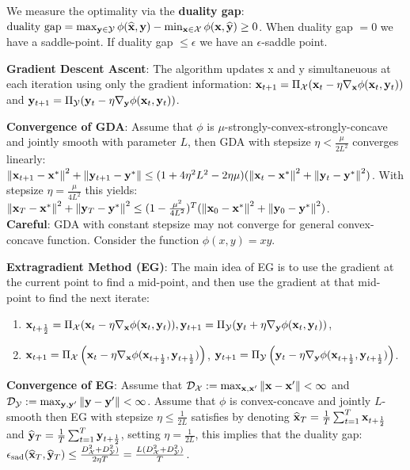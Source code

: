 We measure the optimality via the \textbf{duality gap}: $\text{duality gap} = \max_{\mathbf{y} \in \mathcal{Y}} \phi(\widehat{\mathbf{x}}, \mathbf{y}) - \min_{\mathbf{x} \in \mathcal{X}} \phi(\mathbf{x}, \widehat{\mathbf{y}}) \geq 0$. When duality gap $=0$ we have a saddle-point. If duality gap $\leq \epsilon$ we have an $\epsilon$-saddle point. \\
\begin{framed}
    \textbf{Gradient Descent Ascent}: The algorithm updates x and y simultaneuous at each iteration using
only the gradient information: $\mathbf{x}_{t+1} = \Pi_{\mathcal{X}}(\mathbf{x}_t - \eta \nabla_{\mathbf{x}} \phi(\mathbf{x}_t, \mathbf{y}_t))$ and $\mathbf{y}_{t+1} = \Pi_{\mathcal{Y}}(\mathbf{y}_t - \eta \nabla_{\mathbf{y}} \phi(\mathbf{x}_t, \mathbf{y}_t))$.
\end{framed}
\textbf{Convergence of GDA}: Assume that $\phi$ is $\mu$-strongly-convex-strongly-concave and jointly smooth with parameter $L$, then GDA with stepsize $\eta < \frac{\mu}{2L^2}$ converges linearly: $ \norm{\mathbf{x}_{t+1} - \mathbf{x}^*}^2 + \norm{\mathbf{y}_{t+1} - \mathbf{y}^*} \leq (1 + 4\eta^2 L^2 - 2\eta \mu)(\norm{\mathbf{x}_t - \mathbf{x}^*}^2 + \norm{\mathbf{y}_t - \mathbf{y}^*}^2)$. With stepsize $\eta = \frac{\mu}{4L^2}$ this yields: $\norm{\mathbf{x}_T - \mathbf{x}^*}^2 + \norm{\mathbf{y}_T - \mathbf{y}^*}^2 \leq (1 - \frac{\mu^2}{4L^2})^T (\norm{\mathbf{x}_0 - \mathbf{x}^*}^2 + \norm{\mathbf{y}_0 - \mathbf{y}^*}^2)$. \\
\textbf{Careful}: GDA with constant stepsize may not converge for general convex-concave function. Consider the function $\phi(x, y) = xy$. \\
\begin{framed}
    \textbf{Extragradient Method (EG)}: The main idea of EG is to use the gradient at the current point to find a mid-point, and then use the gradient at that mid-point to find the next iterate:
    \begin{enumerate}[label=, topsep=0pt,itemsep=0ex,partopsep=0ex,parsep=0ex, leftmargin=0cm] 
        \itemsep0em
        \item $\mathbf{x}_{t+\frac{1}{2}} = \Pi_{\mathcal{X}}(\mathbf{x}_t - \eta \nabla_{\mathbf{x}} \phi(\mathbf{x}_t, \mathbf{y}_t)), \mathbf{y}_{t+1} = \Pi_{\mathcal{Y}}(\mathbf{y}_t + \eta \nabla_{\mathbf{y}} \phi(\mathbf{x}_t, \mathbf{y}_t))$,
        \item $\mathbf{x}_{t+1} = \Pi_{\mathcal{X}}\left(\mathbf{x}_t - \eta \nabla_{\mathbf{x}} \phi(\mathbf{x}_{t+\frac{1}{2}}, \mathbf{y}_{t + \frac{1}{2}})\right)$, $\mathbf{y}_{t+1} = \Pi_{\mathcal{Y}}\left(\mathbf{y}_t - \eta \nabla_{\mathbf{y}} \phi(\mathbf{x}_{t+\frac{1}{2}}, \mathbf{y}_{t + \frac{1}{2}})\right)$.
    \end{enumerate}
\end{framed}
\textbf{Convergence of EG}: Assume that $\mathcal{D}_{\mathcal{X}} := \max_{\mathbf{x}, \mathbf{x}'}{\norm{\mathbf{x} - \mathbf{x}'}} < \infty$ and $\mathcal{D}_{\mathcal{Y}} := \max_{\mathbf{y}, \mathbf{y}'}{\norm{\mathbf{y} - \mathbf{y}'}} < \infty$. Assume that $\phi$ is convex-concave and jointly $L$-smooth then EG with stepsize $\eta \leq \frac{1}{2L}$ satisfies by denoting $\widehat{\mathbf{x}}_T = \frac{1}{T}\sum_{t=1}^T{\mathbf{x}_{t+\frac{1}{2}}}$ and $\widehat{\mathbf{y}}_T = \frac{1}{T}\sum_{t=1}^T{\mathbf{y}_{t+\frac{1}{2}}}$, setting $\eta = \frac{1}{2L}$, this implies that the duality gap: $\epsilon_{\text{sad}}(\widehat{\mathbf{x}}_T, \widehat{\mathbf{y}}_T) \leq \frac{D_{\mathcal{X}}^2 + D_{\mathcal{Y}}^2)}{2 \eta T} = \frac{L ( D_{\mathcal{X}}^2 + D_{\mathcal{Y}}^2)}{T}$. \\

